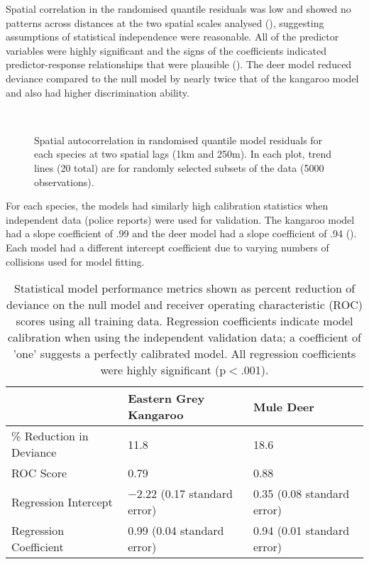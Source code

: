Spatial correlation in the randomised quantile residuals was low and showed no patterns across distances at the two spatial scales analysed (), suggesting assumptions of statistical independence were reasonable. All of the predictor variables were highly significant and the signs of the coefficients indicated predictor-response relationships that were plausible (). The deer model reduced deviance compared to the null model by nearly twice that of the kangaroo model and also had higher discrimination ability.

\begin{figure*}[htp]
  \captionsetup[subfloat]{farskip=-2pt,nearskip=-2pt}
  \centering
  \\
  \caption[Spatial autocorrelation in randomised quantile model residuals for kangaroos and deer]{Spatial autocorrelation in randomised quantile model residuals for each species at two spatial lags (1km and 250m).  In each plot, trend lines (20 total) are for randomly selected subsets of the data (5000 observations).}
  \label{cal_sac}
\end{figure*}

For each species, the models had similarly high calibration statistics when independent data (police reports) were used for validation. The kangaroo model had a slope coefficient of .99 and the deer model had a slope coefficient of .94 (). Each model had a different intercept coefficient due to varying numbers of collisions used for model fitting.

\begin{table}[htp]
\caption[Statistical model performance for kangaroos and deer]{Statistical model performance metrics shown as percent reduction of deviance on the null model and receiver operating characteristic (ROC) scores using all training data. Regression coefficients indicate model calibration when using the independent validation data; a coefficient of 'one' suggests a perfectly calibrated model.  All regression coefficients were highly significant (p$<$.001).}
\begin{tabularx}{0.9\textwidth}{lll} \toprule
                        	&Eastern Grey Kangaroo			&Mule Deer \\ \midrule 
\% Reduction in Deviance 	& 11.8							& 18.6  \\ 
ROC Score 					& 0.79							& 0.88	\\ 
Regression Intercept 		& $-$2.22 (0.17 standard error)	& 0.35 (0.08 standard error) \\ 
Regression Coefficient 		& 0.99 (0.04 standard error)	& 0.94 (0.01 standard error) \\ 
\bottomrule
\end{tabularx}
\label{cal_model_perf}
\end{table}

